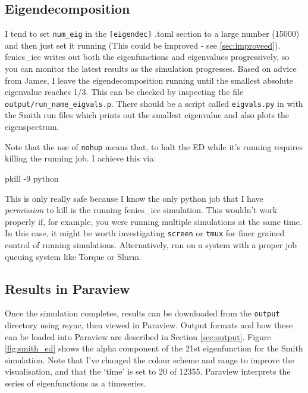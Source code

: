 \documentclass[11pt, reqno, nocenter]{article}
\begin{document}
\subsection{Eigendecomposition}

I tend to set {\tt num\_eig} in the {\tt [eigendec]} .toml section to a large number (15000) and then just set it running (This could be improved -  see \ref{sec:improveed}).
fenics\_ice writes out both the eigenfunctions and eigenvalues progressively, so you can monitor the latest results as the simulation progresses.
Based on advice from James, I leave the eigendecomposition running until the smallest absolute eigenvalue reaches 1/3.
This can be checked by inspecting the file {\tt output/run\_name\_eigvals.p}.
There should be a script called {\tt eigvals.py} in with the Smith run files which prints out the smallest eigenvalue and also plots the eigenspectrum.

Note that the use of {\tt nohup} means that, to halt the ED while it's running requires killing the running job. I achieve this via:

\begin{spverbatim}
  pkill -9 python
\end{spverbatim}

This is only really safe because I know the only python job that I have \emph{permission} to kill is the running fenics\_ice simulation. This wouldn't work properly if, for example, you were running multiple simulations at the same time. In this case, it might be worth investigating {\tt screen} or {\tt tmux} for finer grained control of running simulations.
Alternatively, run on a system with a proper job queuing system like Torque or Slurm.

\subsection{Results in Paraview}

Once the simulation completes, results can be downloaded from the {\tt output} directory using rsync, then viewed in Paraview. Output formats and how these can be loaded into Paraview are described in Section \ref{sec:output}. Figure \ref{fig:smith_ed} shows the alpha component of the 21st eigenfunction for the Smith simulation. Note that I've changed the colour scheme and range to improve the visualisation, and that the `time' is set to 20 of 12355. Paraview interprets the series of eigenfunctions as a timeseries.
\end{document}
